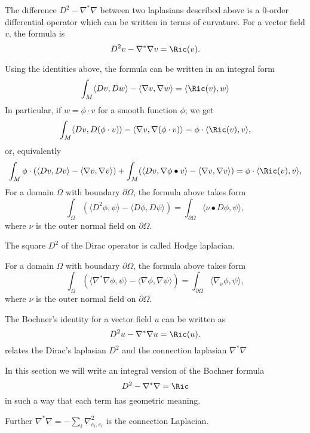 The difference $D^2-\nabla^*\nabla$ between two laplasians described above is a 0-order differential operator which can be written in terms of curvature.
For a vector field $v$, the formula is 
\[D^2v-\nabla^*\nabla v=\Ric(v).\]

Using the identities above, the formula can be written in an integral form
\[\int_M \langle Dv,Dw\rangle -\langle \nabla v,\nabla w\rangle=\langle \Ric(v),w\rangle\]
In particular, if $w=\phi \cdot v$ for a smooth function $\phi$;
we get
\[\int_M \langle Dv,D(\phi\cdot v)\rangle -\langle \nabla v,\nabla(\phi\cdot v) \rangle=\phi\cdot\langle \Ric(v), v\rangle,\]
or, equivalently
\[\int_M \phi\cdot(\langle Dv,D v\rangle -\langle \nabla v,\nabla v \rangle)
+
\int_M (\langle Dv,\nabla \phi \bullet v\rangle -\langle \nabla v,\nabla v \rangle)
=
\phi\cdot\langle \Ric(v), v\rangle,\]
For a domain $\Omega$ with boundary $\partial \Omega$, the formula above takes form
\[\int_\Omega (\langle D^2\phi,\psi\rangle- \langle D\phi,D\psi\rangle)
=
\int_{\partial \Omega}\langle \nu\bullet D\phi,\psi\rangle,\]
where $\nu$ is the outer normal field on $\partial \Omega$.

The square $D^2$ of the Dirac operator is called Hodge laplacian.


For a domain $\Omega$ with boundary $\partial \Omega$, the formula above takes form
\[\int_\Omega (\langle \nabla^*\nabla\phi,\psi\rangle-\langle \nabla\phi,\nabla\psi\rangle)
=
\int_{\partial \Omega}\langle \nabla_\nu \phi,\psi\rangle,\]
where $\nu$ is the outer normal field on $\partial \Omega$.

The Bochner's identity for a vector field $u$ can be written as
\[D^2 u-\nabla^*\nabla u=\Ric(u).\]
relates the Dirac's laplasian $D^2$ and the connection laplasian $\nabla^*\nabla$

In this section we will write an integral version of the Bochner formula \cite[8.3]{lawson-michelsohn}
\[D^2-\nabla^*\nabla=\Ric\]
in such a way that each term has geometric meaning.


Further $\nabla^*\nabla=-\sum_i\nabla^2_{e_i,e_i}$ is the connection Laplacian.
